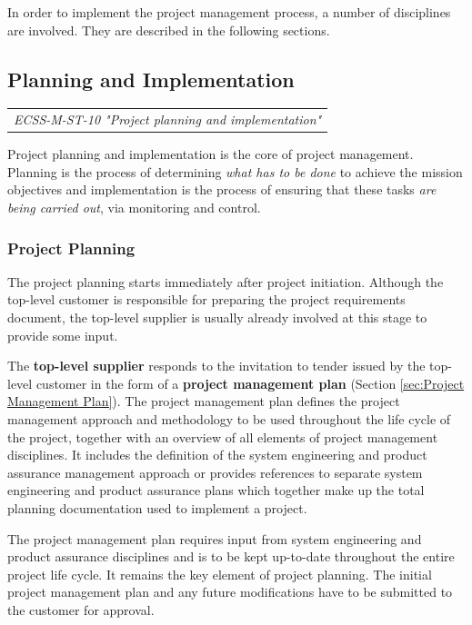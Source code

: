 In order to implement the project management process, a number of disciplines are involved. They are described in the following sections.

\subsection{Planning and Implementation}

\begin{tabular}{l}
\textit{ECSS-M-ST-10 "Project planning and implementation" \cite{ECSS-M-ST-10}}
\end{tabular}

Project planning and implementation is the core of project management. Planning is the process of determining \emph{what has to be done} to achieve the mission objectives and implementation is the process of ensuring that these tasks \emph{are being carried out}, via monitoring and control.

\subsubsection{Project Planning}

The project planning starts immediately after project initiation. Although the top-level customer is responsible for preparing the project requirements document, the top-level supplier is usually already involved at this stage to provide some input.

The \textbf{top-level supplier} responds to the invitation to tender issued by the top-level customer in the form of a \textbf{project management plan} (Section \ref{sec:Project Management Plan}). The project management plan defines the project management approach and methodology to be used throughout the life cycle of the project, together with an overview of all elements of project management disciplines. It includes the definition of the system engineering and product assurance management approach or provides references to separate system engineering and product assurance plans which together make up the total planning documentation used to implement a project.

The project management plan requires input from system engineering and product assurance disciplines and is to be kept up-to-date throughout the entire project life cycle. It remains the key element of project planning. The initial project management plan and any future modifications have to be submitted to the customer for approval.

